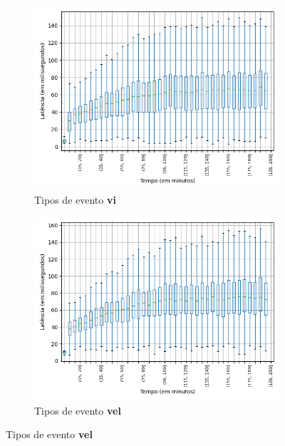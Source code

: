 \begin{figure}
\begin{subfigure}{.5\textwidth}
\centering
\includegraphics[width=\textwidth]{figuras/graphics/boxplot_7-dez-su_vi.png}
\caption{Tipos de evento \textbf{vi}}
\label{fig:BoxPlot_vi_SU_7-dez-su}
\end{subfigure}%
\centering
\begin{subfigure}{.5\textwidth}
\centering
\includegraphics[width=\textwidth]{figuras/graphics/boxplot_7-dez-su_vel.png}
\caption{Tipos de evento \textbf{vel}}
\label{fig:BoxPlot_vel_SU_7-dez-su}
\end{subfigure}%


\end{figure}
